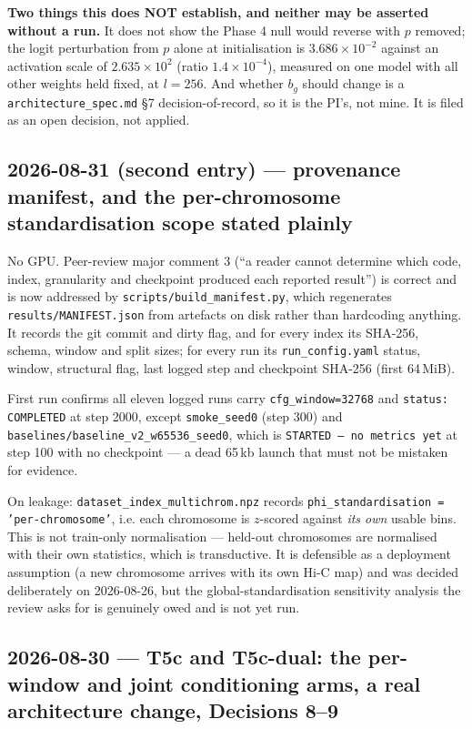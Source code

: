\documentclass[11pt,a4paper]{article}
\newcommand{\code}[1]{\texttt{\small #1}}
\begin{document}
\textbf{Two things this does NOT establish, and neither may be asserted
without a run.} It does not show the Phase 4 null would reverse with $p$
removed; the logit perturbation from $p$ alone at initialisation is
$3.686\times10^{-2}$ against an activation scale of $2.635\times10^{2}$
(ratio $1.4\times10^{-4}$), measured on one model with all other weights held
fixed, at $l = 256$. And whether $b_g$ should change is a
\code{architecture\_spec.md} \S7 decision-of-record, so it is the PI's, not
mine. It is filed as an open decision, not applied.

\subsection*{2026-08-31 (second entry) --- provenance manifest, and the
per-chromosome standardisation scope stated plainly}

No GPU. Peer-review major comment 3 (``a reader cannot determine which code,
index, granularity and checkpoint produced each reported result'') is correct
and is now addressed by \code{scripts/build\_manifest.py}, which regenerates
\code{results/MANIFEST.json} from artefacts on disk rather than hardcoding
anything. It records the git commit and dirty flag, and for every index its
SHA-256, schema, window and split sizes; for every run its
\code{run\_config.yaml} status, window, structural flag, last logged step and
checkpoint SHA-256 (first 64\,MiB).

First run confirms all eleven logged runs carry \code{cfg\_window=32768} and
\code{status: COMPLETED} at step 2000, except \code{smoke\_seed0} (step 300)
and \code{baselines/baseline\_v2\_w65536\_seed0}, which is
\code{STARTED -- no metrics yet} at step 100 with no checkpoint --- a dead
65\,kb launch that must not be mistaken for evidence.

On leakage: \code{dataset\_index\_multichrom.npz} records
\code{phi\_standardisation = 'per-chromosome'}, i.e. each chromosome is
$z$-scored against \emph{its own} usable bins. This is not train-only
normalisation --- held-out chromosomes are normalised with their own
statistics, which is transductive. It is defensible as a deployment assumption
(a new chromosome arrives with its own Hi-C map) and was decided deliberately
on 2026-08-26, but the global-standardisation sensitivity analysis the review
asks for is genuinely owed and is not yet run.

\subsection*{2026-08-30 --- T5c and T5c-dual: the per-window and joint
conditioning arms, a real architecture change, Decisions 8--9}
\end{document}
